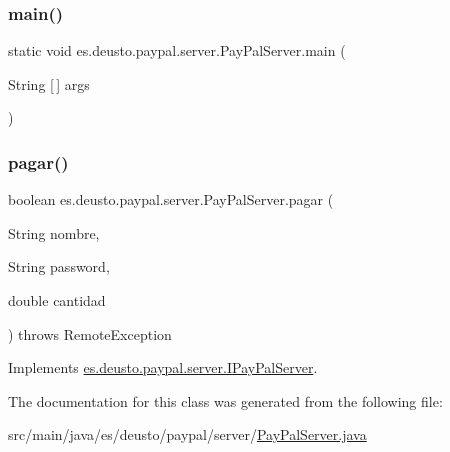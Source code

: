 \subsubsection{\texorpdfstring{main()}{main()}}
{\footnotesize\ttfamily static void es.\+deusto.\+paypal.\+server.\+Pay\+Pal\+Server.\+main (\begin{DoxyParamCaption}\item[{String \mbox{[}$\,$\mbox{]}}]{args }\end{DoxyParamCaption})\hspace{0.3cm}{\ttfamily [static]}}

\mbox{\label{classes_1_1deusto_1_1paypal_1_1server_1_1_pay_pal_server_a3043b77ba4e3b895209cf5f71a52294a}} 
\subsubsection{\texorpdfstring{pagar()}{pagar()}}
{\footnotesize\ttfamily boolean es.\+deusto.\+paypal.\+server.\+Pay\+Pal\+Server.\+pagar (\begin{DoxyParamCaption}\item[{String}]{nombre,  }\item[{String}]{password,  }\item[{double}]{cantidad }\end{DoxyParamCaption}) throws Remote\+Exception}



Implements \mbox{\hyperlink{interfacees_1_1deusto_1_1paypal_1_1server_1_1_i_pay_pal_server_ab1b1c0e07f6c01ccd6d8c3f8a35d6eac}{es.\+deusto.\+paypal.\+server.\+I\+Pay\+Pal\+Server}}.



The documentation for this class was generated from the following file\+:\begin{DoxyCompactItemize}
\item 
src/main/java/es/deusto/paypal/server/\mbox{\hyperlink{_pay_pal_server_8java}{Pay\+Pal\+Server.\+java}}\end{DoxyCompactItemize}
